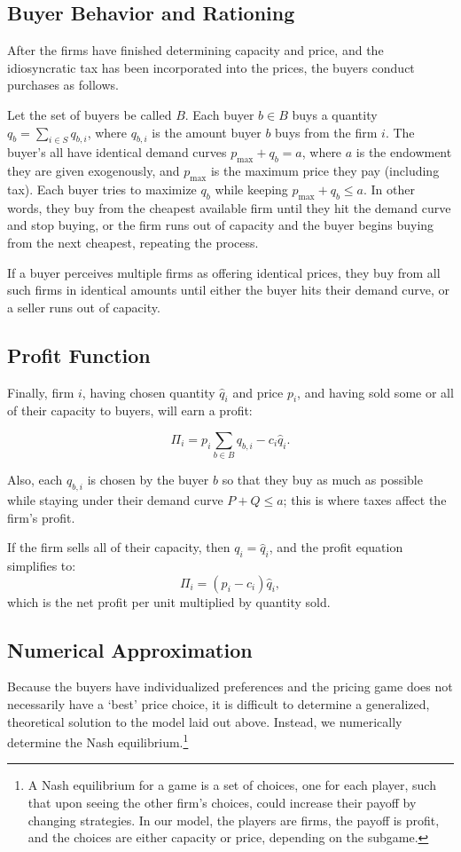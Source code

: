 \documentclass[11pt]{article}
\begin{document}
\subsection{Buyer Behavior and Rationing}
After the firms have finished determining capacity and price, and the
idiosyncratic tax has been incorporated into the prices, the buyers conduct
purchases as follows.

Let the set of buyers be called $B$. Each buyer $b\in B$ buys a quantity $q_b =
\sum_{i\in S} q_{b,i}$, where $q_{b,i}$ is the amount buyer $b$ buys from the
firm $i$. The buyer's all have identical demand curves $p_\text{max} + q_b =
a$, where $a$ is the endowment they are given exogenously, and $p_\text{max}$
is the maximum price they pay (including tax). Each buyer tries to maximize
$q_b$ while keeping $p_\text{max} + q_b \le a$. In other words, they buy from
the cheapest available firm until they hit the demand curve and stop buying, or
the firm runs out of capacity and the buyer begins buying from the next
cheapest, repeating the process.

If a buyer perceives multiple firms as offering identical prices, they buy from
all such firms in identical amounts until either the buyer hits their demand
curve, or a seller runs out of capacity. 

\subsection{Profit Function}
Finally, firm $i$, having chosen quantity $\hat q_i$ and price $p_i$, and
having sold some or all of their capacity to buyers, will earn a profit:

\begin{equation}
    \Pi_i = p_i\sum_{b\in B} q_{b,i} - c_i\hat q_i.
\end{equation}

Also, each $q_{b,i}$ is chosen by the buyer $b$ so that they buy as much as
possible while staying under their demand curve $P+Q\leq a$; this is where
taxes affect the firm's profit.

If the firm sells all of their capacity, then $q_i = \hat q_i$, and the profit
equation simplifies to:
\begin{equation}
    \Pi_i = (p_i- c_i)\hat q_i,
\end{equation}
which is the net profit per unit multiplied by quantity sold.

\subsection{Numerical Approximation}
Because the buyers have individualized preferences and the pricing game does
not necessarily have a `best' price choice, it is difficult to determine a
generalized, theoretical solution to the model laid out above. Instead, we
numerically determine the Nash equilibrium.\footnote{A Nash equilibrium
for a game is a set of choices, one for each player, such that upon seeing the
other firm's choices, could increase their payoff by changing strategies. In
our model, the players are firms, the payoff is profit, and the choices are
either capacity or price, depending on the subgame.}
\end{document}
